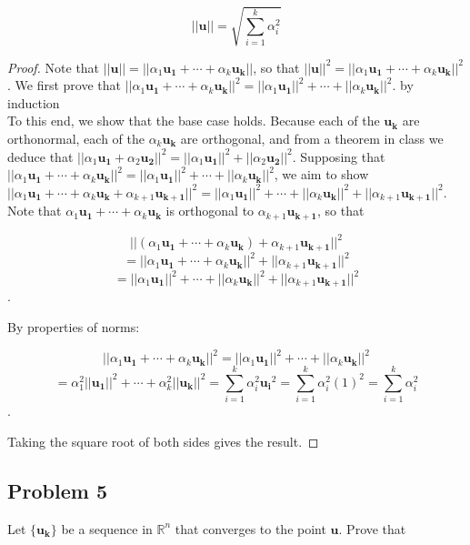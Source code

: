 \documentclass{article}
\begin{document}
\[ ||\mathbf{u}|| = \sqrt{\sum_{i=1}^{k} \alpha_i^2} \]

\begin{proof}

Note that $||\mathbf{u}|| = ||\alpha_1\mathbf{u_1} + \cdots + \alpha_k\mathbf{u_k}||$, so that $||\mathbf{u}||^2 = ||\alpha_1\mathbf{u_1} + \cdots + \alpha_k\mathbf{u_k}||^2$. We first prove that $||\alpha_1\mathbf{u_1} + \cdots + \alpha_k\mathbf{u_k}||^2 = ||\alpha_1\mathbf{u_1}||^2 + \cdots + ||\alpha_k\mathbf{u_k}||^2$. by induction\\ 

To this end, we show that the base case holds. Because each of the $\mathbf{u_k}$ are orthonormal, each of the $\alpha_k\mathbf{u_k}$ are orthogonal, and from a theorem in class we deduce that $||\alpha_1\mathbf{u_1} + \alpha_2\mathbf{u_2}||^2 = ||\alpha_1\mathbf{u_1}||^2 + ||\alpha_2\mathbf{u_2}||^2$. Supposing that $||\alpha_1\mathbf{u_1} + \cdots + \alpha_k\mathbf{u_k}||^2 = ||\alpha_1\mathbf{u_1}||^2 + \cdots + ||\alpha_k\mathbf{u_k}||^2$, we aim to show $||\alpha_1\mathbf{u_1} + \cdots + \alpha_k\mathbf{u_k} + \alpha_{k+1}\mathbf{u_{k+1}}||^2  = ||\alpha_1\mathbf{u_1}||^2 + \cdots + ||\alpha_k\mathbf{u_k}||^2 + ||\alpha_{k+1}\mathbf{u_{k+1}}||^2$. Note that $\alpha_1\mathbf{u_1} + \cdots + \alpha_k\mathbf{u_k}$ is orthogonal to $\alpha_{k+1}\mathbf{u_{k+1}}$, so that

\[ ||(\alpha_1\mathbf{u_1} + \cdots + \alpha_k\mathbf{u_k}) + \alpha_{k+1}\mathbf{u_{k+1}}||^2 \]
\[ = ||\alpha_1\mathbf{u_1} + \cdots + \alpha_k\mathbf{u_k}||^2 + ||\alpha_{k+1}\mathbf{u_{k+1}}||^2 \]
\[ = ||\alpha_1\mathbf{u_1}||^2 + \cdots + ||\alpha_k\mathbf{u_k}||^2 + ||\alpha_{k+1}\mathbf{u_{k+1}}||^2\].

By properties of norms:

\[ ||\alpha_1\mathbf{u_1} + \cdots + \alpha_k\mathbf{u_k}||^2 = ||\alpha_1\mathbf{u_1}||^2 + \cdots + ||\alpha_k\mathbf{u_k}||^2\]
\[= \alpha_1^2||\mathbf{u_1}||^2 + \cdots + \alpha_k^2||\mathbf{u_k}||^2 = \sum_{i=1}^{k} \alpha_i^2\mathbf{u_i}^2 = \sum_{i=1}^{k} \alpha_i^2(1)^2 = \sum_{i=1}^{k} \alpha_i^2\].

Taking the square root of both sides gives the result.

\end{proof}

\subsection*{Problem 5}
Let $\mathbf{\{u_k\}}$ be a sequence in $\mathbb{R}^n$ that converges to the point $\mathbf{u}$. Prove that 
\end{document}

